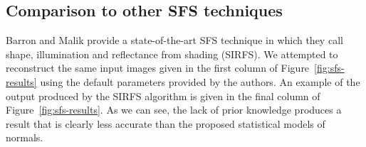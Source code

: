 \subsection{Comparison to other SFS techniques}\label{subsec:sfs-compare}
Barron and Malik provide a state-of-the-art SFS technique in 
\cite{RefWorks:225,RefWorks:224} which they call shape, illumination and 
reflectance from shading (SIRFS). We attempted to reconstruct the same input 
images given in the first column of Figure~\ref{fig:sfs-results} using the 
default parameters provided by the authors. An example of the output produced 
by the SIRFS algorithm is given in the final column of Figure~\ref{fig:sfs-results}. 
As we can see, the lack of prior knowledge produces a result that is clearly 
less accurate than the proposed statistical models of normals.

